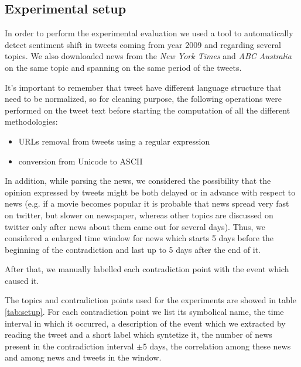 \subsection*{Experimental setup}
In order to perform the experimental evaluation we used a tool to automatically
detect sentiment shift in tweets coming from year 2009 and regarding several
topics. We also downloaded news from the \emph{New York Times} and \emph{ABC
Australia} on the same topic and spanning on the same period of the tweets.

It's important to remember that tweet have different language structure that need to be normalized, so for cleaning purpose, the following operations were performed on the tweet text before starting the computation of all the different methodologies:
\begin{itemize}
	\item URLs removal from tweets using a regular expression
	\item conversion from Unicode to ASCII
\end{itemize}

In addition, while parsing the news, we considered the possibility that the
opinion expressed by tweets might be both delayed or in advance with respect to
news (e.g. if a movie becomes popular it is probable that news spread very fast
on twitter, but slower on newspaper, whereas other topics are discussed on
twitter only after news about them came out for several days). Thus, we
considered a enlarged time window for news which starts 5 days before the
beginning of the contradiction and last up to 5 days after the end of it.

After that, we manually labelled each contradiction point with the event which
caused it. 

The topics and contradiction points used for the experiments 
are showed in table \ref{tab:setup}. For each contradiction point we list its
symbolical name, the time interval in which it occurred, a description of the event
which we extracted by reading the tweet and a short label which syntetize it,
the number of news present in the contradiction interval $\pm 5$ days,
the correlation among these news and among news and tweets in the window.

